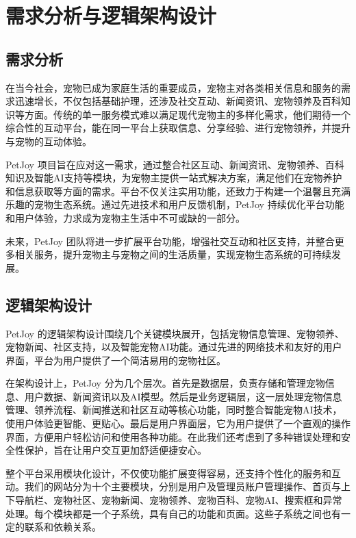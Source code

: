 \section{需求分析与逻辑架构设计}\label{sec:Requirements_Analysis_and_Logical_Architecture_Design}

\subsection{需求分析}

在当今社会，宠物已成为家庭生活的重要成员，宠物主对各类相关信息和服务的需求迅速增长，不仅包括基础护理，还涉及社交互动、新闻资讯、宠物领养及百科知识等方面。传统的单一服务模式难以满足现代宠物主的多样化需求，他们期待一个综合性的互动平台，能在同一平台上获取信息、分享经验、进行宠物领养，并提升与宠物的互动体验。

PetJoy 项目旨在应对这一需求，通过整合社区互动、新闻资讯、宠物领养、百科知识及智能AI支持等模块，为宠物主提供一站式解决方案，满足他们在宠物养护和信息获取等方面的需求。平台不仅关注实用功能，还致力于构建一个温馨且充满乐趣的宠物生态系统。通过先进技术和用户反馈机制，PetJoy 持续优化平台功能和用户体验，力求成为宠物主生活中不可或缺的一部分。

未来，PetJoy 团队将进一步扩展平台功能，增强社交互动和社区支持，并整合更多相关服务，提升宠物主与宠物之间的生活质量，实现宠物生态系统的可持续发展。

\subsection{逻辑架构设计}

PetJoy 的逻辑架构设计围绕几个关键模块展开，包括宠物信息管理、宠物领养、宠物新闻、社区支持，以及智能宠物AI功能。通过先进的网络技术和友好的用户界面，平台为用户提供了一个简洁易用的宠物社区。

在架构设计上，PetJoy 分为几个层次。首先是数据层，负责存储和管理宠物信息、用户数据、新闻资讯以及AI模型。然后是业务逻辑层，这一层处理宠物信息管理、领养流程、新闻推送和社区互动等核心功能，同时整合智能宠物AI技术，使用户体验更智能、更贴心。最后是用户界面层，它为用户提供了一个直观的操作界面，方便用户轻松访问和使用各种功能。在此我们还考虑到了多种错误处理和安全性保护，旨在让用户交互更加舒适便捷安心。

整个平台采用模块化设计，不仅使功能扩展变得容易，还支持个性化的服务和互动。我们的网站分为十个主要模块，分别是用户及管理员账户管理操作、首页与上下导航栏、宠物社区、宠物新闻、宠物领养、宠物百科、宠物AI、搜索框和异常处理。每个模块都是一个子系统，具有自己的功能和页面。这些子系统之间也有一定的联系和依赖关系。

